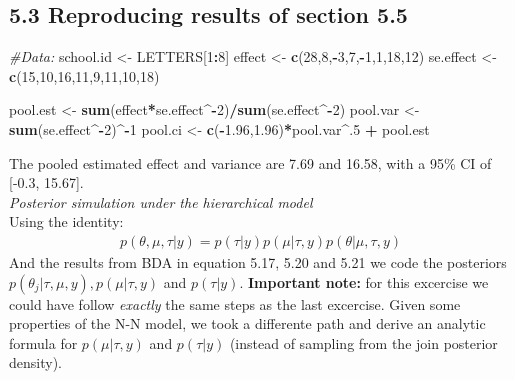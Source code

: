 \documentclass[]{article}
\newenvironment{Shaded}{\begin{snugshade}}{\end{snugshade}}
\newcommand{\KeywordTok}[1]{\textcolor[rgb]{0.13,0.29,0.53}{\textbf{#1}}}
\newcommand{\DecValTok}[1]{\textcolor[rgb]{0.00,0.00,0.81}{#1}}
\newcommand{\FloatTok}[1]{\textcolor[rgb]{0.00,0.00,0.81}{#1}}
\newcommand{\StringTok}[1]{\textcolor[rgb]{0.31,0.60,0.02}{#1}}
\newcommand{\CommentTok}[1]{\textcolor[rgb]{0.56,0.35,0.01}{\textit{#1}}}
\newcommand{\OperatorTok}[1]{\textcolor[rgb]{0.81,0.36,0.00}{\textbf{#1}}}
\newcommand{\NormalTok}[1]{#1}
\begin{document}
\subsection{5.3 Reproducing results of section
5.5}\label{reproducing-results-of-section-5.5}

\begin{Shaded}
\begin{Highlighting}[]
\CommentTok{#Data:}
\NormalTok{school.id       <-}\StringTok{ }\NormalTok{LETTERS[}\DecValTok{1}\OperatorTok{:}\DecValTok{8}\NormalTok{]}
\NormalTok{effect          <-}\StringTok{ }\KeywordTok{c}\NormalTok{(}\DecValTok{28}\NormalTok{,}\DecValTok{8}\NormalTok{,}\OperatorTok{-}\DecValTok{3}\NormalTok{,}\DecValTok{7}\NormalTok{,}\OperatorTok{-}\DecValTok{1}\NormalTok{,}\DecValTok{1}\NormalTok{,}\DecValTok{18}\NormalTok{,}\DecValTok{12}\NormalTok{)}
\NormalTok{se.effect       <-}\StringTok{ }\KeywordTok{c}\NormalTok{(}\DecValTok{15}\NormalTok{,}\DecValTok{10}\NormalTok{,}\DecValTok{16}\NormalTok{,}\DecValTok{11}\NormalTok{,}\DecValTok{9}\NormalTok{,}\DecValTok{11}\NormalTok{,}\DecValTok{10}\NormalTok{,}\DecValTok{18}\NormalTok{) }

\NormalTok{pool.est        <-}\StringTok{ }\KeywordTok{sum}\NormalTok{(effect}\OperatorTok{*}\NormalTok{se.effect}\OperatorTok{^-}\DecValTok{2}\NormalTok{)}\OperatorTok{/}\KeywordTok{sum}\NormalTok{(se.effect}\OperatorTok{^-}\DecValTok{2}\NormalTok{)}
\NormalTok{pool.var        <-}\StringTok{ }\KeywordTok{sum}\NormalTok{(se.effect}\OperatorTok{^-}\DecValTok{2}\NormalTok{)}\OperatorTok{^-}\DecValTok{1}
\NormalTok{pool.ci         <-}\StringTok{ }\KeywordTok{c}\NormalTok{(}\OperatorTok{-}\FloatTok{1.96}\NormalTok{,}\FloatTok{1.96}\NormalTok{)}\OperatorTok{*}\NormalTok{pool.var}\OperatorTok{^}\NormalTok{.}\DecValTok{5} \OperatorTok{+}\StringTok{ }\NormalTok{pool.est}
\end{Highlighting}
\end{Shaded}

The pooled estimated effect and variance are 7.69 and 16.58, with a 95\%
CI of {[}-0.3, 15.67{]}.\\
\emph{Posterior simulation under the hierarchical model}\\
Using the identity:\\
\[
\begin{aligned}
p(\theta,\mu,\tau|y) = p(\tau|y)p(\mu|\tau,y)p(\theta|\mu,\tau,y) 
\end{aligned}
\] And the results from BDA in equation 5.17, 5.20 and 5.21 we code the
posteriors \(p(\theta_{j} | \tau, \mu, y), p(\mu|\tau,y)\) and
\(p(\tau|y)\). \textbf{Important note:} for this excercise we could have
follow \emph{exactly} the same steps as the last excercise. Given some
properties of the N-N model, we took a differente path and derive an
analytic formula for \(p(\mu|\tau,y)\) and \(p(\tau|y)\) (instead of
sampling from the join posterior density).
\end{document}
